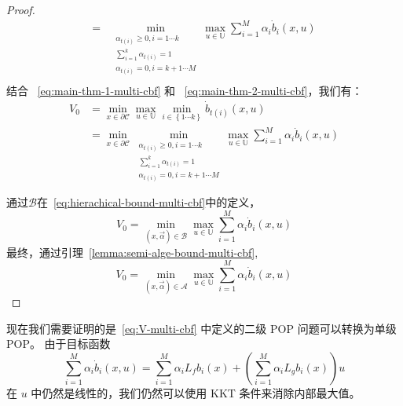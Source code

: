 \begin{proof}
\begin{eqnarray}
= & \min _{\begin{array}{c}
	\alpha _{t\left( i \right)}\ge 0,i=1\cdots k\\
	\sum_{i=1}^k{\alpha _{t\left( i \right)}}=1\\
	\alpha _{t\left( i \right)}=0,i=k+1\cdots M\\
\end{array}}\max _{u\in \mathbb{U}}\sum_{i=1}^M{\alpha _i}\dot{b}_i\left( x,u \right) 
\end{eqnarray}
结合 ~\eqref{eq:main-thm-1-multi-cbf} 和 ~\eqref{eq:main-thm-2-multi-cbf}，我们有：
\begin{equation}
\begin{aligned}
	V_0&=\min _{x\in \partial \mathcal{C}}\max _{u\in \mathbb{U}}\min _{i\in \left\{ 1\cdots k \right\}}\dot{b}_{t\left( i \right)}\left( x,u \right)\\
	&=\min _{x\in \partial \mathcal{C}}\min _{\begin{array}{c}
	\alpha _{t\left( i \right)}\ge 0,i=1\cdots k\\
	\sum_{i=1}^k{\alpha _{t\left( i \right)}}=1\\
	\alpha _{t\left( i \right)}=0,i=k+1\cdots M\\
\end{array}}\max _{u\in \mathbb{U}}\sum_{i=1}^M{\alpha _i}\dot{b}_i\left( x,u \right)\\
\end{aligned}
\end{equation}
通过$\mathcal{B}$在~\eqref{eq:hierachical-bound-multi-cbf}中的定义，
\begin{equation}
V_0=\min _{\left( x,\overrightarrow{\alpha } \right) \in \mathcal{B}}\max _{u\in \mathbb{U}}\sum_{i=1}^M{\alpha _i}\dot{b}_i\left( x,u \right) 
\end{equation}
最终，通过引理~\ref{lemma:semi-alge-bound-multi-cbf},
\begin{equation}
V_0=\min _{\left( x,\overrightarrow{\alpha } \right) \in \mathcal{A}}\max _{u\in \mathbb{U}}\sum_{i=1}^M{\alpha _i}\dot{b}_i\left( x,u \right) 
\end{equation}
\end{proof}

现在我们需要证明的是~\eqref{eq:V-multi-cbf} 中定义的二级 POP 问题可以转换为单级 POP。 由于目标函数
\begin{equation}
\sum_{i=1}^M{\alpha _i\dot{b}_i\left( x,u \right)}=\sum_{i=1}^M{\alpha _iL_fb_i\left( x \right)}+\left( \sum_{i=1}^M{\alpha _iL_gb_i\left( x \right)} \right) u
\end{equation}
在 $u$ 中仍然是线性的，我们仍然可以使用 KKT 条件来消除内部最大值。



